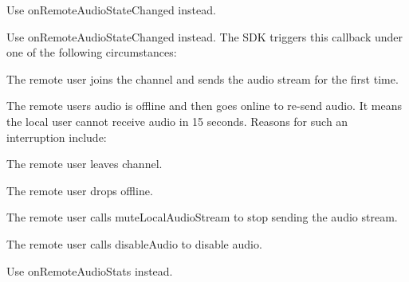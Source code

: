 \begin{DoxyRefList}
Use {\ttfamily on\+Remote\+Audio\+State\+Changed} instead. 
\item[Member \mbox{\hyperlink{classagora_1_1rtc_1_1_i_rtc_engine_event_handler_ex_a45a7a2a31b5942a9432745f7da267c92}{agora\+::rtc\+::I\+Rtc\+Engine\+Event\+Handler\+Ex\+::on\+First\+Remote\+Audio\+Decoded}} (const \mbox{\hyperlink{structagora_1_1rtc_1_1_rtc_connection}{Rtc\+Connection}} \&connection, uid\+\_\+t uid, int elapsed) \+\_\+\+\_\+deprecated]\label{deprecated__deprecated000033}%
%
Use {\ttfamily on\+Remote\+Audio\+State\+Changed} instead. The S\+DK triggers this callback under one of the following circumstances\+:
\begin{DoxyItemize}
\item The remote user joins the channel and sends the audio stream for the first time.
\item The remote user\textquotesingle{}s audio is offline and then goes online to re-\/send audio. It means the local user cannot receive audio in 15 seconds. Reasons for such an interruption include\+:
\begin{DoxyItemize}
\item The remote user leaves channel.
\item The remote user drops offline.
\item The remote user calls mute\+Local\+Audio\+Stream to stop sending the audio stream.
\item The remote user calls disable\+Audio to disable audio.  
\end{DoxyItemize}
\end{DoxyItemize}
\item[Member \mbox{\hyperlink{classagora_1_1rtc_1_1_i_rtc_engine_event_handler_ex_a6bf3c2c89cf1b5e5f4cc082d9c09a68c}{agora\+::rtc\+::I\+Rtc\+Engine\+Event\+Handler\+Ex\+::on\+Remote\+Audio\+Transport\+Stats}} (const \mbox{\hyperlink{structagora_1_1rtc_1_1_rtc_connection}{Rtc\+Connection}} \&connection, uid\+\_\+t remote\+Uid, unsigned short delay, unsigned short lost, unsigned short rx\+K\+Bit\+Rate) \+\_\+\+\_\+deprecated]\label{deprecated__deprecated000034}%
%
Use {\ttfamily on\+Remote\+Audio\+Stats} instead. 
\item[Member \mbox{\hyperlink{classagora_1_1rtc_1_1_i_rtc_engine_event_handler_ex_ab6d8edb58bfb322cf7e3da01c496202b}{agora\+::rtc\+::I\+Rtc\+Engine\+Event\+Handler\+Ex\+::on\+Remote\+Video\+Transport\+Stats}} (const \mbox{\hyperlink{structagora_1_1rtc_1_1_rtc_connection}{Rtc\+Connection}} \&connection, uid\+\_\+t remote\+Uid, unsigned short delay, unsigned short lost, unsigned short rx\+K\+Bit\+Rate) \+\_\+\+\_\+deprecated]\label{deprecated__deprecated000035}%

\end{DoxyRefList}
